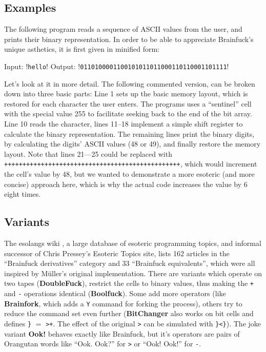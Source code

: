\subsection{Examples}

The following program reads a sequence of ASCII values from the user, and prints their binary representation. In order to be able to appreciate Brainfuck's unique asthetics, it is first given in minified form:



\begin{io}
Input: !\texttt{hello}!
Output: !\texttt{0110100001100101011011000110110001101111}!
\end{io}

Let's look at it in more detail. The following commented version, can be broken down into three basic parts: Line 1 sets up the basic memory layout, which is restored for each character the user enters. The programs uses a “sentinel” cell with the special value 255 to facilitate seeking back to the end of the bit array. Line 10 reads the character, lines 11--18 implement a simple shift register to calculate the binary representation. The remaining lines print the binary digits, by calculating the digits' ASCII values (48 or 49), and finally restore the memory layout. Note that lines 21---25 could be replaced with \texttt{++++++++++++++++++++++++++++++++++++++++++++++++}, which would increment the cell's value by 48, but we wanted to demonstrate a more esoteric (and more concise) approach here, which is why the actual code increases the value by 6 eight times.



\subsection{Variants}

The esolangs wiki \cite{esolang}, a large database of esoteric programming topics, and informal successor of Chris Pressey's Esoteric Topics site, lists 162 articles in the “Brainfuck derivatives” category and 33 “Brainfuck equivalents”, which were all inspired by Müller's original implementation. There are variants which operate on two tapes (\textbf{DoubleFuck}), restrict the cells to binary values, thus making the \texttt{+} and \texttt{-} operations identical (\textbf{Boolfuck}). Some add more operators (like \textbf{Brainfork}, which adds a \texttt{Y} command for forking the process), others try to reduce the command set even further (\textbf{BitChanger} also works on bit cells and defines \texttt{\}} $=$ \texttt{>+}. The effect of the original \texttt{>} can be simulated with \texttt{\}<\}}).
The joke variant \textbf{Ook!} behaves exactly like Brainfuck, but it's operators are pairs of Orangutan words like “Ook. Ook?” for \texttt{>} or “Ook! Ook!” for \texttt{-}.

